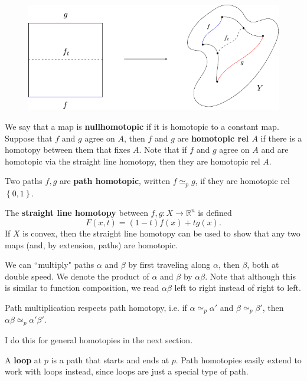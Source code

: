 \documentclass[twoside,10pt]{report}
\begin{document}
\begin{figure}[H]
	\centering
	\includegraphics[scale=1]{fig/homotopy.pdf}
\end{figure}

We say that a map is \textbf{nullhomotopic} if it is homotopic to a constant map. Suppose that $f$ and $g$ agree on $A$, then $f$ and $g$ are \textbf{homotopic rel $A$} if there is a homotopy between them that fixes $A$. Note that if $f$ and $g$ agree on $A$ and are homotopic via the straight line homotopy, then they are homotopic rel $A$.

\begin{defn}[]
Two paths $f,g$ are \textbf{path homotopic}, written $f \simeq_p g$, if they are homotopic rel $\left\{ 0,1 \right\}$.
\end{defn}

The \textbf{straight line homotopy} between $f,g:X\to \mathbb{R}^{n}$ is defined
\[
	F(x,t) = (1-t)f(x)+tg(x).
\] 
If $X$ is convex, then the straight line homotopy can be used to show that any two maps (and, by extension, paths) are homotopic.

We can ``multiply" paths $\alpha$ and $\beta$ by first traveling along $\alpha$, then $\beta$, both at double speed. We denote the product of $\alpha$ and $\beta$ by $\alpha\beta$. Note that although this is similar to function composition, we read $\alpha\beta$ left to right instead of right to left.

\begin{prop}
Path multiplication respects path homotopy, i.e. if $\alpha \simeq_p \alpha'$ and $\beta \simeq_p \beta'$, then $\alpha\beta \simeq_{p} \alpha'\beta'$.
\end{prop}
{\color{red}I do this for general homotopies in the next section.}

A \textbf{loop} at $p$ is a path that starts and ends at $p$. Path homotopies easily extend to work with loops instead, since loops are just a special type of path.
\end{document}
